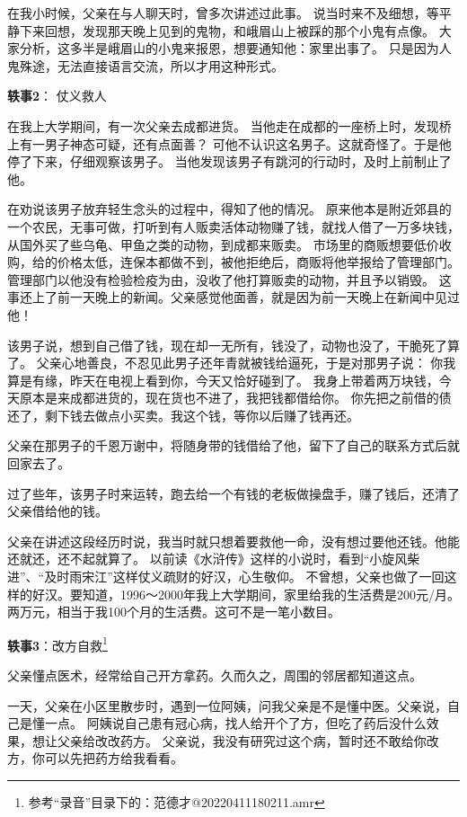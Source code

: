 在我小时候，父亲在与人聊天时，曾多次讲述过此事。
说当时来不及细想，等平静下来回想，发现那天晚上见到的鬼物，和峨眉山上被踩的那个小鬼有点像。
大家分析，这多半是峨眉山的小鬼来报恩，想要通知他：家里出事了。
只是因为人鬼殊途，无法直接语言交流，所以才用这种形式。

\textbf{轶事2}： 仗义救人

在我上大学期间，有一次父亲去成都进货。
当他走在成都的一座桥上时，发现桥上有一男子神态可疑，还有点面善？
可他不认识这名男子。这就奇怪了。于是他停了下来，仔细观察该男子。
当他发现该男子有跳河的行动时，及时上前制止了他。

在劝说该男子放弃轻生念头的过程中，得知了他的情况。
原来他本是附近郊县的一个农民，无事可做，打听到有人贩卖活体动物赚了钱，就找人借了一万多块钱，
从国外买了些乌龟、甲鱼之类的动物，到成都来贩卖。
市场里的商贩想要低价收购，给的价格太低，连保本都做不到，被他拒绝后，商贩将他举报给了管理部门。
管理部门以他没有检验检疫为由，没收了他打算贩卖的动物，并且予以销毁。
这事还上了前一天晚上的新闻。父亲感觉他面善，就是因为前一天晚上在新闻中见过他！

该男子说，想到自己借了钱，现在却一无所有，钱没了，动物也没了，干脆死了算了。
父亲心地善良，不忍见此男子还年青就被钱给逼死，于是对那男子说：
你我算是有缘，昨天在电视上看到你，今天又恰好碰到了。
我身上带着两万块钱，今天原本是来成都进货的，现在货也不进了，我把钱都借给你。
你先把之前借的债还了，剩下钱去做点小买卖。我这个钱，等你以后赚了钱再还。

父亲在那男子的千恩万谢中，将随身带的钱借给了他，留下了自己的联系方式后就回家去了。

过了些年，该男子时来运转，跑去给一个有钱的老板做操盘手，赚了钱后，还清了父亲借给他的钱。

父亲在讲述这段经历时说，我当时就只想着要救他一命，没有想过要他还钱。他能还就还，还不起就算了。
以前读《水浒传》这样的小说时，看到“小旋风柴进”、“及时雨宋江”这样仗义疏财的好汉，心生敬仰。
不曾想，父亲也做了一回这样的好汉。要知道，1996～2000年我上大学期间，家里给我的生活费是200元/月。
两万元，相当于我100个月的生活费。这可不是一笔小数目。


\textbf{轶事3}：改方自救\footnote{参考“录音”目录下的：范德才@20220411180211.amr}

父亲懂点医术，经常给自己开方拿药。久而久之，周围的邻居都知道这点。

一天，父亲在小区里散步时，遇到一位阿姨，问我父亲是不是懂中医。父亲说，自己是懂一点。
阿姨说自己患有冠心病，找人给开个了方，但吃了药后没什么效果，想让父亲给改改药方。
父亲说，我没有研究过这个病，暂时还不敢给你改方，你可以先把药方给我看看。

